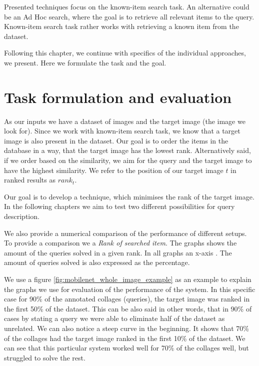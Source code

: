 Presented techniques focus on the known-item search task. An alternative could be an Ad Hoc search, where the goal is to retrieve all relevant items to the query. Known-item search task rather works with retrieving a known item from the dataset.

Following this chapter, we continue with specifics of the individual approaches, we present. Here we formulate the task and the goal.

\section*{Task formulation and evaluation}

As our inputs we have a dataset of images and the target image (the image we look for). Since we work with known-item search task, we know that a target image is also present in the dataset. Our goal is to order the items in the database in a way, that the target image has the lowest rank. Alternatively said, if we order based on the similarity, we aim for the query and the target image to have the highest similarity. We refer to the position of our target image $t$ in ranked results as $rank_t$.

Our goal is to develop a technique, which minimises the rank of the target image. In the following chapters we aim to test two different possibilities for query description.

We also provide a numerical comparison of the performance of different setups. To provide a comparison we a \emph{Rank of searched item}. The graphs shows the amount of the queries solved in a given rank. In all graphs an x-axis  . The amount of queries solved is also expressed as the percentage.



We use a figure \ref{fig:mobilenet_whole_image_example} as an example to explain the graphs we use for evaluation of the performance of the system. In this specific case for 90\% of the annotated collages (queries), the target image was ranked in the first 50\% of the dataset. This can be also said in other words, that in 90\% of cases by stating a query we were able to eliminate half of the dataset as unrelated. We can also notice a steep curve in the beginning. It shows that 70\% of the collages had the target image ranked in the first 10\% of the dataset. We can see that this particular system worked well for 70\% of the collages well, but struggled to solve the rest.

